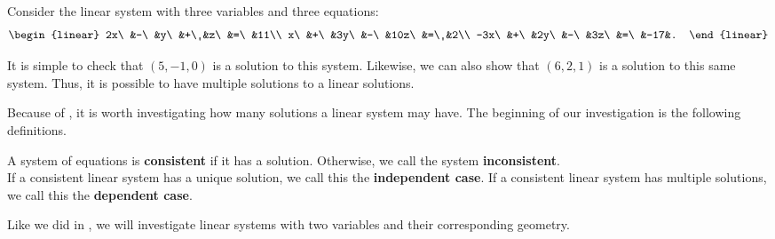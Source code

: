 \begin{Exam}\label{exam:1.1dependent} Consider the linear system with three variables and three equations: \[\begin{linear} 2x\ &-\ &y\ &+\ &z\ &=\ &11\\ x\ &+\ &3y\ &-\ &10z\ &=\ &2\\ -3x\ &+\ &2y\ &-\ &3z\ &=\ &-17&. \end{linear}\] %

It is simple to check that $(5,-1,0)$ is a solution to this system. Likewise, we can also show that $(6,2,1)$ is a solution to this same system. Thus, it is possible to have multiple solutions to a linear solutions.
\end{Exam}\vs

Because of , it is worth investigating how many solutions a linear system may have. The beginning of our investigation is the following definitions.\\


\begin{Def}\label{def:consistent} A system of equations is \textbf{consistent} if it has a solution. Otherwise, we call the system \textbf{inconsistent}.\\

If a consistent linear system has a unique solution, we call this the \textbf{independent case}.\label{def:uniquesoln} If a consistent linear system has multiple solutions, we call this the \textbf{dependent case}.\end{Def}\vs

Like we did in , we will investigate linear systems with two variables and their corresponding geometry.\\

